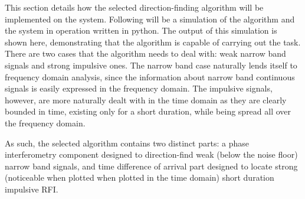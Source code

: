 This section details how the selected direction-finding algorithm will be implemented on the system. Following will be a simulation of the algorithm and the system in operation written in python. The output of this simulation is shown here, demonstrating that the algorithm is capable of carrying out the task.\\

There are two cases that the algorithm needs to deal with: weak narrow band signals and strong impulsive ones. The narrow band case naturally lends itself to frequency domain analysis, since the information about narrow band continuous signals is easily expressed in the frequency domain. The impulsive signals, however, are more naturally dealt with in the time domain as they are clearly bounded in time, existing only for a short duration, while being spread all over the frequency domain. 

As such, the selected algorithm contains two distinct parts: a phase interferometry component designed to direction-find weak (below the noise floor) narrow band signals, and time difference of arrival part designed to locate strong (noticeable when plotted when plotted in the time domain) short duration impulsive RFI.

